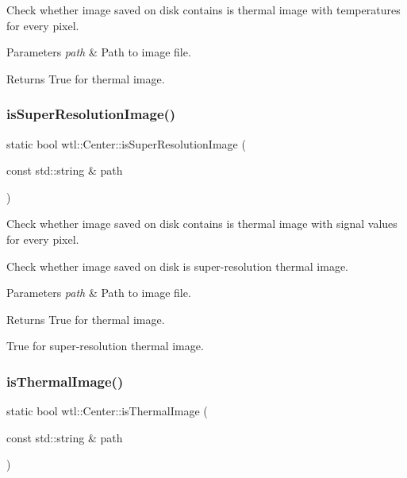 Check whether image saved on disk contains is thermal image with temperatures for every pixel. 


\begin{DoxyParams}{Parameters}
{\em path} & Path to image file. \\
\hline
\end{DoxyParams}
\begin{DoxyReturn}{Returns}
True for thermal image. 
\end{DoxyReturn}
\mbox{\label{classwtl_1_1_center_a83518abd0aee527ce310515bd02d37c5}} 
\subsubsection{\texorpdfstring{is\+Super\+Resolution\+Image()}{isSuperResolutionImage()}}
{\footnotesize\ttfamily static bool wtl\+::\+Center\+::is\+Super\+Resolution\+Image (\begin{DoxyParamCaption}\item[{const std\+::string \&}]{path }\end{DoxyParamCaption})\hspace{0.3cm}{\ttfamily [static]}}



Check whether image saved on disk contains is thermal image with signal values for every pixel. 

Check whether image saved on disk is super-\/resolution thermal image. 
\begin{DoxyParams}{Parameters}
{\em path} & Path to image file. \\
\hline
\end{DoxyParams}
\begin{DoxyReturn}{Returns}
True for thermal image. 

True for super-\/resolution thermal image. 
\end{DoxyReturn}
\mbox{\label{classwtl_1_1_center_a545bc4811dbd26759f3795a7ac65b8dc}} 
\subsubsection{\texorpdfstring{is\+Thermal\+Image()}{isThermalImage()}}
{\footnotesize\ttfamily static bool wtl\+::\+Center\+::is\+Thermal\+Image (\begin{DoxyParamCaption}\item[{const std\+::string \&}]{path }\end{DoxyParamCaption})\hspace{0.3cm}{\ttfamily [static]}}



